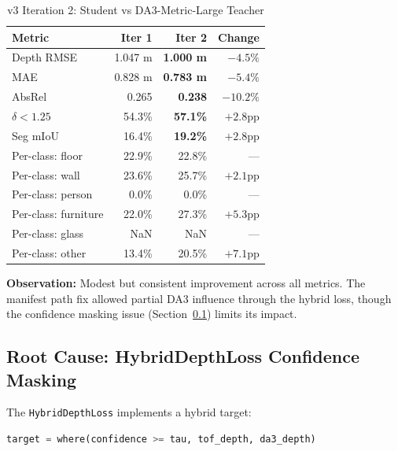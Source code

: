 \documentclass[11pt,a4paper]{article}
\begin{document}
\begin{table}[h]
\centering
\caption{v3 Iteration 2: Student vs DA3-Metric-Large Teacher}
\label{tab:v3-iter2-eval}
\begin{tabular}{lrrr}
\toprule
\textbf{Metric} & \textbf{Iter 1} & \textbf{Iter 2} & \textbf{Change} \\
\midrule
Depth RMSE              & 1.047 m & \textcolor{improved}{\textbf{1.000 m}} & $-4.5\%$ \\
MAE                     & 0.828 m & \textcolor{improved}{\textbf{0.783 m}} & $-5.4\%$ \\
AbsRel                  & 0.265   & \textcolor{improved}{\textbf{0.238}}   & $-10.2\%$ \\
$\delta < 1.25$         & 54.3\%  & \textcolor{improved}{\textbf{57.1\%}}  & $+2.8$pp \\
\midrule
Seg mIoU                & 16.4\%  & \textcolor{improved}{\textbf{19.2\%}}  & $+2.8$pp \\
Per-class: floor        & 22.9\%  & 22.8\% & --- \\
Per-class: wall         & 23.6\%  & \textcolor{improved}{25.7\%} & $+2.1$pp \\
Per-class: person       & 0.0\%   & 0.0\%  & --- \\
Per-class: furniture    & 22.0\%  & \textcolor{improved}{27.3\%} & $+5.3$pp \\
Per-class: glass        & NaN     & NaN    & --- \\
Per-class: other        & 13.4\%  & \textcolor{improved}{20.5\%} & $+7.1$pp \\
\bottomrule
\end{tabular}
\end{table}

\textbf{Observation:} Modest but consistent improvement across all metrics.
The manifest path fix allowed partial DA3 influence through the hybrid loss,
though the confidence masking issue (Section~\ref{sec:confidence-mask})
limits its impact.

\subsection{Root Cause: HybridDepthLoss Confidence Masking}
\label{sec:confidence-mask}

The \texttt{HybridDepthLoss} implements a hybrid target:

\begin{lstlisting}[language=Python]
target = where(confidence >= tau, tof_depth, da3_depth)
\end{lstlisting}
\end{document}
